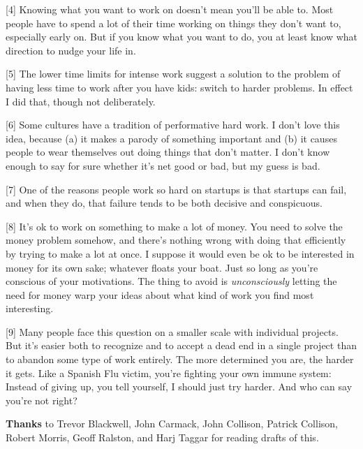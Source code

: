 [4] Knowing what you want to work on doesn't mean you'll be
                  able to. Most people have to spend a lot of their time working
                  on things they don't want to, especially early on. But if you
                  know what you want to do, you at least know what direction to
                  nudge your life in.

[5] The lower time limits for intense work suggest a solution
                  to the problem of having less time to work after you have
                  kids: switch to harder problems. In effect I did that, though
                  not deliberately.

[6] Some cultures have a tradition of performative hard work. I
                  don't love this idea, because (a) it makes a parody of
                  something important and (b) it causes people to wear
                  themselves out doing things that don't matter. I don't know
                  enough to say for sure whether it's net good or bad, but my
                  guess is bad.

[7] One of the reasons people work so hard on startups is that
                  startups can fail, and when they do, that failure tends to be
                  both decisive and conspicuous.

[8] It's ok to work on something to make a lot of money. You
                  need to solve the money problem somehow, and there's nothing
                  wrong with doing that efficiently by trying to make a lot at
                  once. I suppose it would even be ok to be interested in money
                  for its own sake; whatever floats your boat. Just so long as
                  you're conscious of your motivations. The thing to avoid is
                  \emph{unconsciously} letting the need for money warp your
                  ideas about what kind of work you find most interesting.

[9] Many people face this question on a smaller scale with
                  individual projects. But it's easier both to recognize and to
                  accept a dead end in a single project than to abandon some
                  type of work entirely. The more determined you are, the harder
                  it gets. Like a Spanish Flu victim, you're fighting your own
                  immune system: Instead of giving up, you tell yourself, I
                  should just try harder. And who can say you're not right?




                  \textbf{Thanks} to Trevor Blackwell, John Carmack, John
                  Collison, Patrick Collison, Robert Morris, Geoff Ralston, and
                  Harj Taggar for reading drafts of this.


              
            
          
